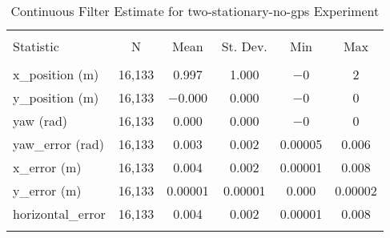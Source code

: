 
\begin{table}[h] \centering 
  \caption{Continuous Filter Estimate for two-stationary-no-gps Experiment} 
  \label{tab:two_stationary_no_gps_continuous_summary} 
\begin{tabular}{@{\extracolsep{5pt}}lccccc} 
\\[-1.8ex]\hline 
\hline \\[-1.8ex] 
Statistic & \multicolumn{1}{c}{N} & \multicolumn{1}{c}{Mean} & \multicolumn{1}{c}{St. Dev.} & \multicolumn{1}{c}{Min} & \multicolumn{1}{c}{Max} \\ 
\hline \\[-1.8ex] 
x\_position (m) & 16,133 & \num{0.997} & \num{1.000} & $-$0 & 2 \\ 
y\_position (m) & 16,133 & \num{-0.000} & \num{0.000} & $-$0 & 0 \\ 
yaw (rad) & 16,133 & \num{0.000} & \num{0.000} & $-$0 & 0 \\ 
yaw\_error (rad) & 16,133 & \num{0.003} & \num{0.002} & \num{0.00005} & \num{0.006} \\ 
x\_error (m) & 16,133 & \num{0.004} & \num{0.002} & \num{0.00001} & \num{0.008} \\ 
y\_error (m) & 16,133 & \num{0.00001} & \num{0.00001} & \num{0.000} & \num{0.00002} \\ 
horizontal\_error & 16,133 & \num{0.004} & \num{0.002} & \num{0.00001} & \num{0.008} \\ 
\hline \\[-1.8ex] 
\end{tabular} 
\end{table} 
